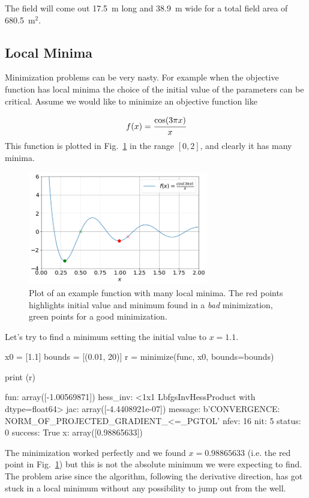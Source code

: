 The field will come out 17.5~m long and 38.9~m wide for a total field area of 680.5~$\textrm{m}^2$.

\subsection{Local Minima}
Minimization problems can be very nasty.
For example when the objective function has local minima the choice of the initial value of the parameters can be critical. 
Assume we would like to minimize an objective function like 

\[
f(x) = \cfrac{\mathrm{cos}(3\pi x)}{x}
\]
This function is plotted in Fig.~\ref{fig:local_minima} in the range $[0, 2]$, and clearly it has many minima. 

\begin{figure}[htb]
	\centering
	\includegraphics[width=0.7\textwidth]{figures/local_minima}
	\caption{Plot of an example function with many local minima. The red points highlights initial value and minimum found in a \emph{bad} minimization, green points for a good minimization.}
	\label{fig:local_minima}
\end{figure}
Let's try to find a minimum setting the initial value to $x=1.1$.
\begin{ipython}
x0 = [1.1]
bounds = [(0.01, 20)]
r = minimize(func, x0, bounds=bounds)

print (r)
\end{ipython}
\begin{ioutput}
     fun: array([-1.00569871])
hess_inv: <1x1 LbfgsInvHessProduct with dtype=float64>
     jac: array([-4.4408921e-07])
 message: b'CONVERGENCE: NORM_OF_PROJECTED_GRADIENT_<=_PGTOL'
    nfev: 16
     nit: 5
  status: 0
 success: True
       x: array([0.98865633])
\end{ioutput}
The minimization worked perfectly and we found $x=0.98865633$ (i.e. the red point in Fig.~\ref{fig:local_minima}) but this is not the absolute minimum we were expecting to find. The problem arise since the algorithm, following the derivative direction, has got stuck in a local minimum without any possibility to jump out from the well.


